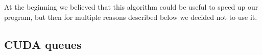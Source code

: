 At the beginning we believed that this algorithm could be useful to speed up our program, but then for multiple reasons described below we decided not to use it.

\subsection{CUDA queues}
